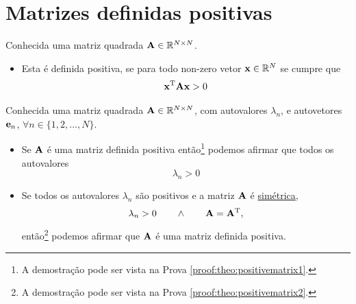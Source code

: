 \section{ Matrizes definidas positivas}


\begin{definition}\label{def:positivematrix0}
Conhecida uma matriz quadrada $\MATRIX{A} \in \mathbb{R}^{N \times N}$. 
\begin{itemize}
\item Esta é definida positiva, se para todo non-zero vetor $\VECTOR{x} \in \mathbb{R}^N$
se cumpre que \cite[pp. 159]{golub2013matrix} 
\begin{equation}
\VECTOR{x}^{\transpose} \MATRIX{A} \VECTOR{x} > 0
\end{equation}
\end{itemize}
\end{definition}




\begin{theorem}\label{theo:positivematrix1}
Conhecida uma matriz quadrada $\MATRIX{A} \in \mathbb{R}^{N \times N}$, com  autovalores $\lambda_n$,
e autovetores $\VECTOR{e}_n$, $\forall n \in \{1, 2, ..., N\}$.
\begin{itemize}
\item Se $\MATRIX{A}$ é uma matriz definida positiva então\footnote{\label{foot:theo:positivematrix1}A
demostração pode ser vista na Prova \ref{proof:theo:positivematrix1}.}  
podemos afirmar que todos os autovalores 
\begin{equation}
\lambda_n > 0
\end{equation}
\item Se todos os autovalores $\lambda_n$ são positivos e a matriz $\MATRIX{A}$ é \hyperref[def:symmetricmatrix0]{simétrica},
\begin{equation}
\lambda_n > 0 \qquad \wedge \qquad \MATRIX{A}=\MATRIX{A}^{\transpose},
\end{equation}
 então\footnote{A
demostração pode ser vista na Prova \ref{proof:theo:positivematrix2}.} 
podemos afirmar que $\MATRIX{A}$ é uma matriz definida positiva.
\end{itemize}
\end{theorem}

